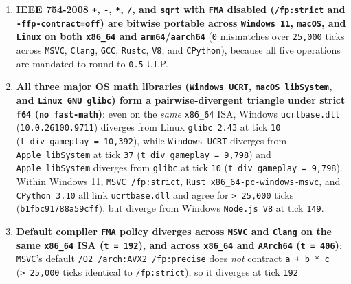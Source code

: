 \documentclass[10pt,letterpaper]{article}
\providecommand{\tightlist}{\setlength{\itemsep}{1pt}\setlength{\parskip}{0pt}}
\begin{document}
\begin{enumerate}
\def\labelenumi{\arabic{enumi}.}
\tightlist
\item
  \textbf{IEEE 754-2008 \texttt{+}, \texttt{-}, \texttt{*}, \texttt{/},
  and \texttt{sqrt} with \texttt{FMA} disabled (\texttt{/\allowbreak{}fp:strict} and
  \texttt{-\allowbreak{}ffp-\allowbreak{}contract=off}) are bitwise portable across
  \texttt{Windows\ 11}, \texttt{macOS}, and \texttt{Linux} on both
  \texttt{x86\_64} and \texttt{arm64}/\allowbreak{}\texttt{aarch64}} (\texttt{0}
  mismatches over \texttt{25,000} ticks across \texttt{MSVC},
  \texttt{Clang}, \texttt{GCC}, \texttt{Rustc}, \texttt{V8}, and
  \texttt{CPython}), because all five operations are mandated to round
  to \texttt{0.5} ULP.
\item
  \textbf{All three major OS math libraries (\texttt{Windows\ UCRT},
  \texttt{macOS\ libSystem}, and \texttt{Linux\ GNU\ glibc}) form a
  pairwise-divergent triangle under strict \texttt{f64}
  (\texttt{no\ fast-\allowbreak{}math})}: even on the \emph{same} \texttt{x86\_64}
  ISA, Windows \texttt{ucrtbase.\allowbreak{}dll} (\texttt{10.\allowbreak{}0.\allowbreak{}26100.\allowbreak{}9711}) diverges
  from Linux \texttt{glibc\ 2.\allowbreak{}43} at tick \texttt{10}
  (\texttt{t\_\allowbreak{}div\_\allowbreak{}gameplay\ =\ 10,\allowbreak{}392}), while \texttt{Windows\ UCRT}
  diverges from \texttt{Apple\ libSystem} at tick \texttt{37}
  (\texttt{t\_\allowbreak{}div\_\allowbreak{}gameplay\ =\ 9,\allowbreak{}798}) and \texttt{Apple\ libSystem}
  diverges from \texttt{glibc} at tick \texttt{10}
  (\texttt{t\_\allowbreak{}div\_\allowbreak{}gameplay\ =\ 9,\allowbreak{}798}). Within Windows 11,
  \texttt{MSVC\ /\allowbreak{}fp:strict}, \texttt{Rust\ x86\_\allowbreak{}64-\allowbreak{}pc-\allowbreak{}windows-\allowbreak{}msvc}, and
  \texttt{CPython\ 3.\allowbreak{}10} all link \texttt{ucrtbase.\allowbreak{}dll} and agree for
  \texttt{\textgreater{}\ 25,000} ticks (\texttt{b1fbc917\allowbreak{}88a59cff}), but
  diverge from Windows \texttt{Node.\allowbreak{}js\ V8} at tick \texttt{149}.
\item
  \textbf{Default compiler \texttt{FMA} policy diverges across
  \texttt{MSVC} and \texttt{Clang} on the same \texttt{x86\_64} ISA
  (\texttt{t\ =\ 192}), and across \texttt{x86\_64} and \texttt{AArch64}
  (\texttt{t\ =\ 406})}: \texttt{MSVC}'s default
  \texttt{/\allowbreak{}O2\ /\allowbreak{}arch:AVX2\ /\allowbreak{}fp:precise} does \emph{not} contract
  \texttt{a\ +\ b\ *\ c} (\texttt{\textgreater{}\ 25,000} ticks
  identical to \texttt{/\allowbreak{}fp:strict}), so it diverges at tick \texttt{192}

\end{enumerate}
\end{document}
